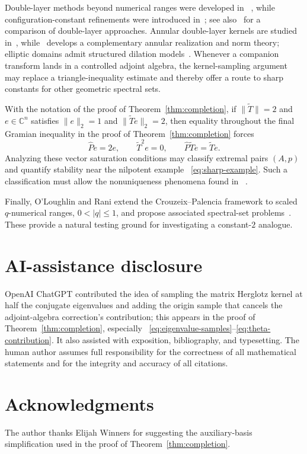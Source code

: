 \documentclass[preprints,article,submit,oneauthor]{Definitions/mdpi}
\theoremstyle{mdpi}
\theoremstyle{definition}
\newcommand{\C}{\mathbb C}
\begin{document}
Double-layer methods beyond numerical ranges were developed in~%
\cite{CrouzeixGreenbaum2019}, while configuration-constant refinements
were introduced in~\cite{MalmanEtAl2025}; see also~%
\cite{SchwenningerDeVries2025} for a comparison of double-layer
approaches.
Annular double-layer kernels are studied in~\cite{JuryTsikalas2024},
while~\cite{AglerLykovaYoung2025} develops a complementary annular
realization and norm theory; elliptic domains admit structured dilation
models~\cite{AglerLykovaYoung2024}.  Whenever a companion transform
lands in a controlled adjoint algebra, the kernel-sampling argument may
replace a triangle-inequality estimate and thereby offer a route to
sharp constants for other geometric spectral sets.

With the notation of the proof of Theorem~\ref{thm:completion},
if $\lVert\widetilde T\rVert=2$ and $e\in\C^n$ satisfies
$\lVert e\rVert_2=1$ and $\lVert\widetilde Te\rVert_2=2$, then equality
throughout the final Gramian inequality in the proof of
Theorem~\ref{thm:completion} forces
\[
  \widehat Pe=2e,
  \qquad \widetilde T^2e=0,
  \qquad \widehat P\widetilde Te=\widetilde Te.
\]
Analyzing these vector saturation conditions may classify extremal
pairs $(A,p)$ and quantify stability near the nilpotent example~%
\eqref{eq:sharp-example}.  Such a
classification must allow the nonuniqueness phenomena found in~%
\cite{Li2020}.

Finally, O'Loughlin and Rani extend the Crouzeix--Palencia framework to
scaled $q$-numerical ranges, $0<\lvert q\rvert\leq1$, and propose associated
spectral-set problems~\cite{OLoughlinRani2026}.  These provide a natural
testing ground for investigating a constant-$2$ analogue.

\section*{AI-assistance disclosure}

OpenAI ChatGPT contributed the idea of sampling the matrix Herglotz
kernel at half the conjugate eigenvalues and adding the origin sample
that cancels the adjoint-algebra correction's contribution; this
appears in the proof of Theorem~\ref{thm:completion}, especially~%
\eqref{eq:eigenvalue-samples}--\eqref{eq:theta-contribution}.  It also
assisted with exposition, bibliography, and typesetting.  The human
author assumes full responsibility for the correctness of all
mathematical statements and for the integrity and accuracy of all
citations.

\section*{Acknowledgments}

The author thanks Elijah Winners for suggesting the auxiliary-basis
simplification used in the proof of
Theorem~\ref{thm:completion}.


\end{document}
